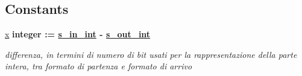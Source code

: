 \subsection*{Constants}
 \begin{DoxyCompactItemize}
\item 
\hyperlink{group___truncation_ga63701d8af27da7452a7588efcff357bc}{x} {\bfseries \textcolor{vhdlchar}{integer}\textcolor{vhdlchar}{ }\textcolor{vhdlchar}{ }\textcolor{vhdlchar}{\+:}\textcolor{vhdlchar}{=}\textcolor{vhdlchar}{ }\textcolor{vhdlchar}{ }\textcolor{vhdlchar}{ }\textcolor{vhdlchar}{ }{\bfseries \hyperlink{group___truncation_gabe72b503b8140ab0d84911165e959b53}{s\+\_\+in\+\_\+int}} \textcolor{vhdlchar}{-\/}\textcolor{vhdlchar}{ }\textcolor{vhdlchar}{ }\textcolor{vhdlchar}{ }{\bfseries \hyperlink{group___truncation_ga4ca792ca981e2f9d82bf36d9c82c08af}{s\+\_\+out\+\_\+int}} \textcolor{vhdlchar}{ }} 
\begin{DoxyCompactList}\small\item\em differenza, in termini di numero di bit usati per la rappresentazione della parte intera, tra formato di partenza e formato di arrivo \end{DoxyCompactList}\end{DoxyCompactItemize}
